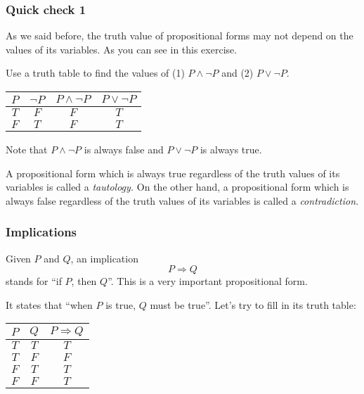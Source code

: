\begin{frame}\frametitle{Quick check 1}
  As we said before, the truth value of propositional forms may not
  depend on the values of its variables.  As you can see in this
  exercise.
  
  Use a truth table to find the values of (1) $P\wedge \neg P$ and (2)
  $P\vee\neg P$.
  \pause

  \begin{tcolorbox}[title=And/Or/Not]
    \begin{tabular}{|c|c||c|c|}
      \hline
      $P$ & $\neg P$ & $P\wedge\neg P$ & $P\vee\neg P$\\
      \hline
      $T$ & $F$ & $F$ & $T$ \\
      $F$ & $T$ & $F$ & $T$ \\
      \hline
    \end{tabular}
  \end{tcolorbox}
  \pause

  Note that $P\wedge\neg P$ is always false and $P\vee\neg P$ is always true.

  A propositional form which is always true regardless of the truth
  values of its variables is called a {\em tautology.}  On the other
  hand, a propositional form which is always false regardless of the
  truth values of its variables is called a {\em contradiction.}
\end{frame}

\begin{frame}\frametitle{Implications}
  Given $P$ and $Q$, an implication
  \[P\Rightarrow Q\]
  stands for ``if $P$, then $Q$''.  This is a very important
  propositional form.

  It states that ``when $P$ is true, $Q$ must be true''.  Let's try to
  fill in its truth table:

  \begin{tcolorbox}[title=Implications]
    \begin{tabular}{|c|c||c|}
      \hline
      $P$ & $Q$ & $P\Rightarrow Q$ \\
      \hline
      $T$ & $T$ & \pause $T$ \\
      $T$ & $F$ & \pause $F$ \\
      $F$ & $T$ & \pause $T$ \\
      $F$ & $F$ & \pause $T$ \\
      \hline
    \end{tabular}
  \end{tcolorbox}
\end{frame}

